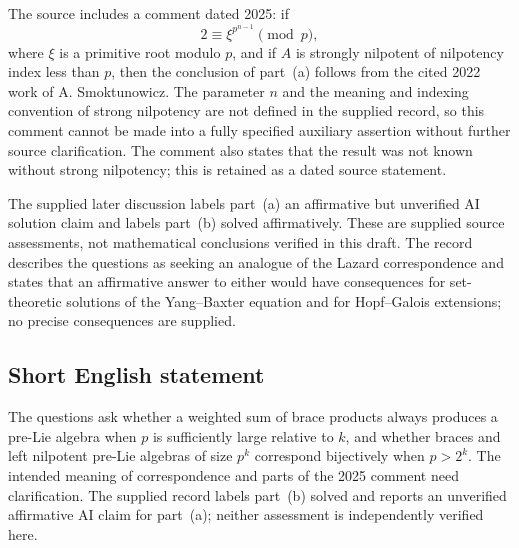 \documentclass[11pt]{article}
\begin{document}
The source includes a comment dated 2025: if
\[
2\equiv\xi^{p^{n-1}}\pmod p,
\]
where \(\xi\) is a primitive root modulo \(p\), and if \(A\) is strongly nilpotent of nilpotency index less than \(p\), then the conclusion of part~(a) follows from the cited 2022 work of A. Smoktunowicz. The parameter \(n\) and the meaning and indexing convention of strong nilpotency are not defined in the supplied record, so this comment cannot be made into a fully specified auxiliary assertion without further source clarification. The comment also states that the result was not known without strong nilpotency; this is retained as a dated source statement.

The supplied later discussion labels part~(a) an affirmative but unverified AI solution claim and labels part~(b) solved affirmatively. These are supplied source assessments, not mathematical conclusions verified in this draft. The record describes the questions as seeking an analogue of the Lazard correspondence and states that an affirmative answer to either would have consequences for set-theoretic solutions of the Yang--Baxter equation and for Hopf--Galois extensions; no precise consequences are supplied.
\subsection{Short English statement}
The questions ask whether a weighted sum of brace products always produces a pre-Lie algebra when \(p\) is sufficiently large relative to \(k\), and whether braces and left nilpotent pre-Lie algebras of size \(p^k\) correspond bijectively when \(p>2^k\). The intended meaning of correspondence and parts of the 2025 comment need clarification. The supplied record labels part~(b) solved and reports an unverified affirmative AI claim for part~(a); neither assessment is independently verified here.
\end{document}
